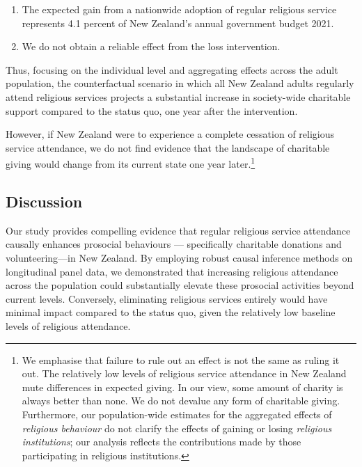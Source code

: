 \documentclass[
  single column]{article}
\providecommand{\tightlist}{%
  \setlength{\itemsep}{0pt}\setlength{\parskip}{0pt}}\usepackage{longtable,booktabs,array}
\begin{document}
\begin{enumerate}
\def\labelenumi{\arabic{enumi}.}
\tightlist
\item
  The expected gain from a nationwide adoption of regular religious
  service represents 4.1 percent of New Zealand's annual government
  budget 2021.
\item
  We do not obtain a reliable effect from the loss intervention.
\end{enumerate}

Thus, focusing on the individual level and aggregating effects across
the adult population, the counterfactual scenario in which all New
Zealand adults regularly attend religious services projects a
substantial increase in society-wide charitable support compared to the
status quo, one year after the intervention.

However, if New Zealand were to experience a complete cessation of
religious service attendance, we do not find evidence that the landscape
of charitable giving would change from its current state one year
later.\footnote{We emphasise that failure to rule out an effect is not
  the same as ruling it out. The relatively low levels of religious
  service attendance in New Zealand mute differences in expected giving.
  In our view, some amount of charity is always better than none. We do
  not devalue any form of charitable giving. Furthermore, our
  population-wide estimates for the aggregated effects of
  \emph{religious behaviour} do not clarify the effects of gaining or
  losing \emph{religious institutions}; our analysis reflects the
  contributions made by those participating in religious institutions.}

\subsection{Discussion}\label{discussion}

Our study provides compelling evidence that regular religious service
attendance causally enhances prosocial behaviours --- specifically
charitable donations and volunteering---in New Zealand. By employing
robust causal inference methods on longitudinal panel data, we
demonstrated that increasing religious attendance across the population
could substantially elevate these prosocial activities beyond current
levels. Conversely, eliminating religious services entirely would have
minimal impact compared to the status quo, given the relatively low
baseline levels of religious attendance.
\end{document}
